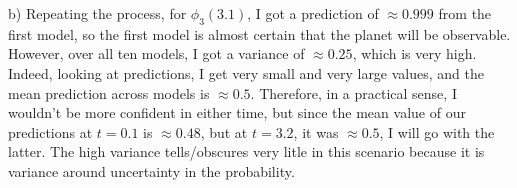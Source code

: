 \documentclass[submit]{harvardml}
\newenvironment{ans}{
  \begin{enumerate}
  \color{blue}
}{
  \end{enumerate}
  \color{black}
}
\begin{document}
\begin{ans}
    \newline
    \newline
    \qquad b) Repeating the process, for $\phi_3(3.1)$, I got a prediction of $\approx 0.999$ from the first model, so the first model is almost certain that the planet will be observable. However, over all ten models, I got a variance of $\approx 0.25$, which is very high. Indeed, looking at predictions, I get very small and very large values, and the mean prediction across models is $\approx 0.5$. Therefore, in a practical sense, I wouldn't be more confident in either time, but since the mean value of our predictions at $t = 0.1$ is $\approx 0.48$, but at $t = 3.2$, it was $\approx 0.5$, I will go with the latter. The high variance tells/obscures very litle in this scenario because it is variance around uncertainty in the probability. 
\end{ans}
\end{document}
